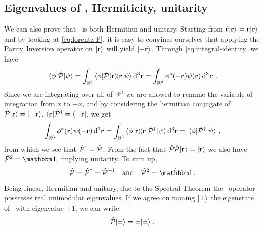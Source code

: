        \subsection{Eigenvalues of \hP, Hermiticity, unitarity}
            We can also prove that \hP\ is both Hermitian and unitary. Starting from $\hat{\vb{r}}\!\ket{\vb{r}} = \vb{r}\!\ket{\vb{r}}$ and by looking at \eqref{eq:lorentz-P}, it is easy to convince ourselves that applying the Parity Inversion operator on $\ket{\vb{r}}$ will yield $\ket{-\vb{r}}$. Through \eqref{eq:integral-identity} we have
            \begin{equation*}
                \mel{\phi}{\hP}{\psi}
                = \int\nolimits_{\bbR^3}\bra{\phi}\!\hP\!\ket{\vb{r}}\!\!\bra{\vb{r}}\ket{\psi}\dd[3]{\vb{r}}
                = \int\nolimits_{\bbR^3}\phi^*\pqty{-\vb{r}}\psi\pqty{\vb{r}}\dd[3]{\vb{r}}
                \myperiod
            \end{equation*}
            Since we are integrating over all of $\mathbb{R}^3$ we are allowed to rename the variable of integration from $x$ to $-x$, and by considering the hermitian conjugate of $\mathcal{\hat{P}}\!\ket{\vb{r}} = \ket{-\vb{r}}$, $\bra{\vb{r}}\!\mathcal{\hat{P}}^\dag = \bra{-\vb{r}}$, we get
            \begin{equation*}
                \int\nolimits_{\bbR^3}\phi^*\pqty{\vb{r}}\psi\pqty{-\vb{r}}\dd[3]{\vb{r}}
                = \int\nolimits_{\bbR^3}\bra{\phi}\ket{\vb{r}}\!\!\bra{\vb{r}}\!\hP^\dag\!\ket{\psi}\dd[3]{\vb{r}}
                = \mel{\phi}{\hP^\dag}{\psi}
                \mycomma
            \end{equation*}
            from which we see that $\mathcal{\hat{P}}^\dag = \mathcal{\hat{P}}$. From the fact that $\mathcal{\hat{P}}\mathcal{\hat{P}}\!\ket{\vb{r}} = \ket{\vb{r}}$ we also have $\hP^2 = \hidM$, implying unitarity. To sum up,
            \begin{equation}
                \label{eq:P-properties}
                \hP
                = \hP^\dag
                = \hP^{-1}
                \qand
                \hP^2
                = \togglehat{\idM}
                \myperiod
            \end{equation}

            Being linear, Hermitian and unitary, due to the Spectral Theorem the \hP\ operator possesses real unimodular eigenvalues. If we agree on naming $\ket{\pm}$ the eigenstate of \hP\ with eigenvalue $\pm 1$, we can write
            \begin{equation}
                \label{eq:eigenvalue-problem-P}
                \mathcal{\hat{P}}\!\ket{\pm}
                = \pm\!\ket{\pm}\,\text{.}
            \end{equation}
        
